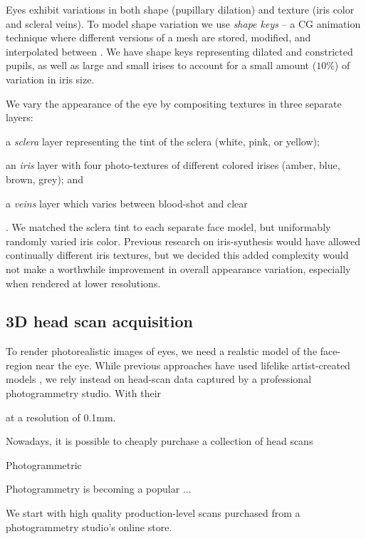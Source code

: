 Eyes exhibit variations in both shape (pupillary dilation) and texture (iris color and scleral veins). To model shape variation we use \emph{shape keys} -- a CG animation technique where different versions of a mesh are stored, modified, and interpolated between \cite{orvalho2012facial}.  We have shape keys representing dilated and constricted pupils, as well as large and small irises to account for a small amount ($10\%$) of variation in iris size.

We vary the appearance of the eye by compositing textures in three separate layers:
\begin{inparaenum}
\item a \emph{sclera} layer representing the tint of the sclera (white, pink, or yellow);
\item an \emph{iris} layer with four photo-textures of different colored irises (amber, blue, brown, grey); and
\item a \emph{veins} layer which varies between blood-shot and clear
\end{inparaenum}. We matched the sclera tint to each separate face model, but uniformably randomly varied iris color. Previous research on iris-synthesis  would have allowed continually different iris textures, but we decided this added complexity would not make a worthwhile improvement in overall appearance variation, especially when rendered at lower resolutions.

\subsection{3D head scan acquisition}



To render photorealistic images of eyes, we need a realstic model of the face-region near the eye. While previous approaches have used lifelike artist-created models \cite{swirski2014rendering}, we rely instead on head-scan data  captured by a professional photogrammetry studio. With their 

 at a resolution of 0.1mm.

Nowadays, it is possible to cheaply purchase a collection of head scans

Photogrammetric 

Photogrammetry is becoming a popular ...

We start with high quality production-level scans purchased from a photogrammetry studio's online store.

